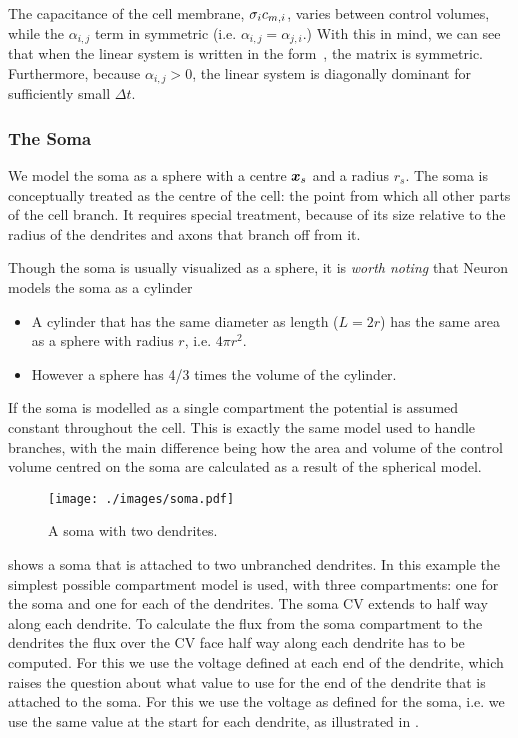 The capacitance of the cell membrane, $\sigma_i c_{m,i}$, varies between control volumes, while the $\alpha_{i,j}$ term in symmetric (i.e. $\alpha_{i,j}=\alpha_{j,i}$.)
With this in mind, we can see that when the linear system is written in the form~, the matrix is symmetric.
Furthermore, because $\alpha_{i,j} > 0$, the linear system is diagonally dominant for sufficiently small $\Delta t$.

\subsubsection{The Soma}
We model the soma as a sphere with a centre $\bm{x}_s$ and a radius $r_s$.
The soma is conceptually treated as the centre of the cell: the point from which all other parts of the cell branch.
It requires special treatment, because of its size relative to the radius of the dendrites and axons that branch off from it.

Though the soma is usually visualized as a sphere, it is \emph{worth noting} that Neuron models the soma as a cylinder
\begin{itemize}
    \item A cylinder that has the same diameter as length ($L=2r$) has the same area as a sphere with radius $r$, i.e. $4\pi r^2$.
    \item However a sphere has 4/3 times the volume of the cylinder.
\end{itemize}

If the soma is modelled as a single compartment the potential is assumed constant throughout the cell.
This is exactly the same model used to handle branches, with the main difference being how the area and volume of the control volume centred on the soma are calculated as a result of the spherical model.

\begin{figure}
    \begin{center}
        \texttt{[image: ./images/soma.pdf]}
    \end{center}
    \caption{A soma with two dendrites.}
    \label{fig:soma}
\end{figure}

 shows a soma that is attached to two unbranched dendrites.
In this example the simplest possible compartment model is used, with three compartments: one for the soma and one for each of the dendrites.
The soma CV extends to half way along each dendrite.
To calculate the flux from the soma compartment to the dendrites the flux over the CV face half way along each dendrite has to be computed.
For this we use the voltage defined at each end of the dendrite, which raises the question about what value to use for the end of the dendrite that is attached to the soma.
For this we use the voltage as defined for the soma, i.e. we use the same value at the start for each dendrite, as illustrated in .

